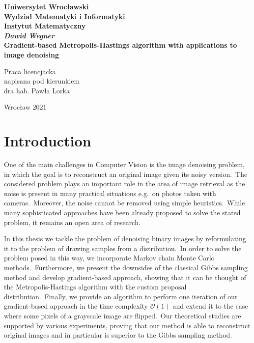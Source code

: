 \documentclass[a4paper, 11pt, onecolumn, openany, titlepage]{report}
\newcommand\blankpage{\null\thispagestyle{empty}\newpage}
\newcommand\unnumberedchapter[1]{\setlength\topskip{3cm}\chapter*{#1}\setlength\topskip{0cm}}
\theoremstyle{default_theorem_style}\newtheorem{theorem}{Theorem}
\theoremstyle{default_theorem_style}\newtheorem{definition}{Definition}
\begin{document}
\setlength\topskip{3cm}
\newpage
\thispagestyle{empty}
\begin{center}
\textbf{\large Uniwersytet Wrocławski\\
Wydział Matematyki i Informatyki\\
Instytut Matematyczny}\\
\vspace{4cm}
\textbf{\textit{\large Dawid Wegner}\\
\vspace{0.5cm}
{\Large Gradient-based Metropolis-Hastings algorithm with applications to image denoising}}\\
\end{center}
\vspace{3cm}
{\large \hspace*{6.5cm}Praca licencjacka\\
\hspace*{6.5cm}napisana pod kierunkiem\\
\hspace*{6.5cm}dra hab. Pawła Lorka}\\
\vfill
\begin{center}
{\large Wrocław 2021}\\
\end{center}
\setlength\topskip{0cm}
\afterpage{\blankpage}

{\hypersetup{linkcolor=black}
\setlength\topskip{3cm}
\tableofcontents
\setlength\topskip{0cm}
}

\unnumberedchapter{Introduction}

One of the main challenges in Computer Vision is the image denoising problem, in which the goal is to reconstruct an
original image given its noisy version.\ The considered problem plays an important role in the area of image
retrieval as the noise is present in many practical situations e.g.\ on photos taken with cameras.\ Moreover, the noise
cannot be removed using simple heuristics.\ While many sophisticated approaches have been already proposed to solve
the stated problem, it remains an open area of research.\newline

In this thesis we tackle the problem of denoising binary images by reformulating it to the problem of drawing samples
from a distribution.\ In order to solve the problem posed in this way, we incorporate Markov chain Monte Carlo
methods.\ Furthermore, we present the downsides of the classical Gibbs sampling method and develop gradient-based
approach, showing that it can be thought of the Metropolis-Hastings algorithm with the custom proposal
distribution.\ Finally, we provide an algorithm to perform one iteration of our gradient-based approach in the
time complexity $\mathcal{O}(1)$ and extend it to the case where some pixels of a grayscale image are
flipped.\ Our theoretical studies are supported by various experiments, proving that our method is able to
reconstruct original images and in particular is superior to the Gibbs sampling method.
\end{document}
